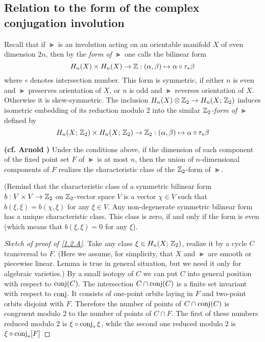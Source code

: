 \documentclass{article}
\numberwithin{equation}{section}
\begin{document}
\subsection{Relation to the form of the complex conjugation
involution}\label{s1.2}
Recall that if $\Gt$ is an involution acting on an orientable manifold
$X$ of even dimension $2n$, then by the {\it form of\/}
$\Gt$ one calls the bilinear form
$$
H_n(X)\times H_n(X)\to\mathbb Z: (\alpha,\beta)\mapsto \alpha\circ\tau_*\beta
$$
where $\circ$ denotes intersection number. This form is symmetric, if
either $n$ is even and $\Gt$ preserves orientation of $X$, or $n$ is
odd and $\Gt$ reverses orientation of $X$. Otherwise it is skew-symmetric.
The inclusion
$H_n(X)\otimes\mathbb Z_2\to H_n(X;\,\mathbb Z_2)$ induces isometric embedding of
its reduction modulo 2 into the similar {\it $\mathbb Z_2$-form of $\Gt$\/}
defined by
$$
H_n(X;\,\mathbb Z_2)\times H_n(X;\,\mathbb Z_2)\to\mathbb Z_2:
(\alpha,\beta)\mapsto \alpha\circ\tau_*\beta
$$

\begin{lem}\label{1.2.A} {\bf(cf. Arnold \cite{A})}
Under the
conditions above, if the dimension of each component of the fixed point set
$F$ of $\Gt$ is at most $n$, then the union of $n$-dimensional
components of $F$ realizes the characteristic class of the $\mathbb Z_2$-form
of $\Gt$.  
\end{lem}

(Remind that the characteristic class of a symmetric bilinear form
$b:V\times V\to\mathbb Z_2$ on $\mathbb Z_2$-vector space $V$ is a vector $\chi\in
V$ such that $b(\xi,\xi)=b(\chi,\xi)$ for any $\xi\in V$. Any
non-degenerate symmetric bilinear form has a unique characteristic
class. This class is zero, if and only if the form is even (which
means that $b(\xi,\xi)=0$ for any $\xi$).

\begin{proof}[Sketch of proof of \ref{1.2.A}] Take any class 
$\xi\in H_n(X;\,\mathbb Z_2)$,
realize it by a cycle $C$ transversal to $F$. (Here we assume, for
simplicity, that $X$ and $\Gt$ are smooth or piecewise linear.
Lemma is true in general situation, but we need it only for
algebraic varieties.) By a small isotopy of $C$ we can put $C$ into
general position with respect to $\operatorname{conj}(C)$. The intersection
$C\cap\operatorname{conj}(C)$ is a finite set invariant with respect to $\operatorname{conj}$. It
consists of one-point orbits laying in $F$ and two-point orbits
disjoint with $F$. Therefore the number of points of $C\cap\operatorname{conj}(C)$
is congruent modulo 2 to the number of points of $C\cap F$. The first
 of these numbers reduced modulo 2 is $\xi\circ\operatorname{conj}_*\xi$, while
the second one reduced modulo 2 is $\xi\circ\operatorname{conj}_*[F]$ \end{proof}
\end{document}
